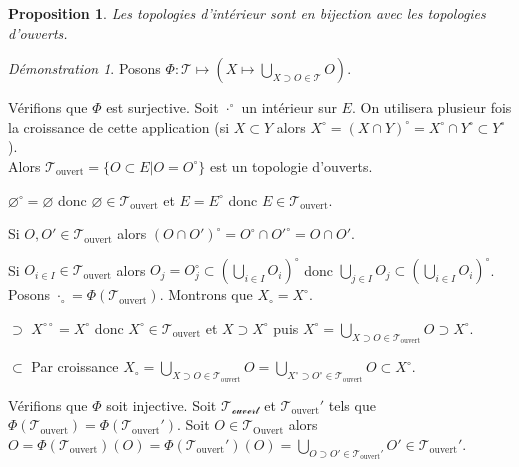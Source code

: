 \documentclass[a4paper, 11pt, french]{book}
\newenvironment{itemise}{\itemize}{\enditemize}
\theoremstyle{plain} %
\newtheorem{proposition}{Proposition}
\theoremstyle{definition} %
\theoremstyle{remark} %
\newtheorem*{demonstration}{Démonstration}
\newcommand{\1}{\mathds{1}}
\newcommand\vide{\varnothing}
\begin{document}
\begin{proposition}
	Les topologies d'intérieur sont en bijection avec les topologies d'ouverts.
\end{proposition}

\begin{demonstration}
	Posons $\Phi\colon\mathscr{T}\mapsto(X\mapsto\bigcup_{X\supset O\in\mathscr{T}}O)$.
	\begin{itemise}
		\item Vérifions que $\Phi$ est surjective.
		Soit $\cdot^\circ$ un intérieur sur $E$.
		On utilisera plusieur fois la croissance de cette application (si $X\subset Y$ alors $X^\circ=(X\cap Y)^\circ=X^\circ\cap Y^\circ\subset Y^\circ$). \\
		Alors $\mathscr{T}_\text{ouvert}=\{O\subset E|O=O^\circ\}$ est un topologie d'ouverts.
		\begin{itemise}
			\item $\vide^\circ=\vide$ donc $\vide\in\mathscr{T}_\text{ouvert}$ et $E=E^\circ$ donc $E\in\mathscr{T}_\text{ouvert}$.
			\item Si $O, O'\in\mathscr{T}_\text{ouvert}$
			alors $(O\cap O')^\circ=O^\circ\cap{O'}^\circ=O\cap O'$.
			\item Si $O_{i\in I}\in\mathscr{T}_\text{ouvert}$
			alors $O_j=O_j^\circ\subset(\bigcup_{i\in I}O_i)^\circ$
			donc $\bigcup_{j\in I}O_j\subset(\bigcup_{i\in I}O_i)^\circ$.
		\end{itemise}
		Posons $\cdot_\circ=\Phi(\mathscr{T}_\text{ouvert})$.
		Montrons que $X_\circ=X^\circ$.
		\begin{itemise}
			\item[$\supset$] $X^{\circ\circ}=X^\circ$ donc $X^\circ\in\mathscr{T}_\text{ouvert}$ et $X\supset X^\circ$ puis $X^\circ=\bigcup_{X\supset O\in\mathscr{T}_\text{ouvert}}O\supset X^\circ$.
			\item[$\subset$] Par croissance $X_\circ=\bigcup_{X\supset O\in\mathscr{T}_\text{ouvert}}O=\bigcup_{X^\circ\supset O^\circ\in\mathscr{T}_\text{ouvert}}O\subset X^\circ$.
		\end{itemise}
		\item Vérifions que $\Phi$ soit injective.
		Soit $\mathscr{T_\text{ouvert}}$ et $\mathscr{T}_\text{ouvert}'$ tels que $\Phi(\mathscr{T}_\text{ouvert})=\Phi(\mathscr{T}_\text{ouvert}')$.
		Soit $O\in\mathscr{T}_\text{Ouvert}$ alors $O=\Phi(\mathscr{T}_\text{ouvert})(O)=\Phi(\mathscr{T}_\text{ouvert}')(O)=\bigcup_{O\supset O'\in\mathscr{T}_\text{ouvert}'}O'\in\mathscr{T}_\text{ouvert}'$.
	\end{itemise}
\end{demonstration}
\end{document}
